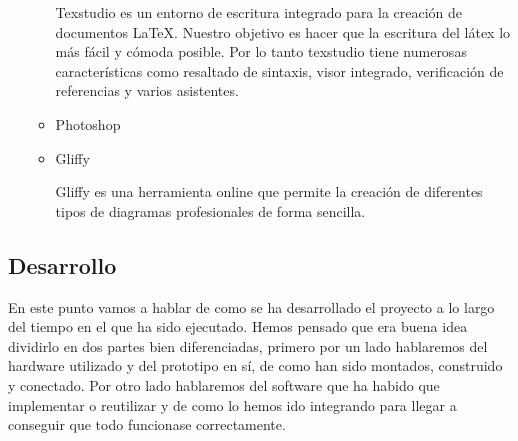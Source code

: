 \documentclass{pclass}
\begin{document}
\begin{itemize}
\begin{itemize}
		Texstudio es un entorno de escritura integrado para la creación de documentos LaTeX. Nuestro objetivo es hacer que la escritura del látex lo más fácil y cómoda posible. Por lo tanto texstudio tiene numerosas características como resaltado de sintaxis, visor integrado, verificación de referencias y varios asistentes.
			\cite{texstudio}
		\item Photoshop
		\item Gliffy
		
		Gliffy es una herramienta online que permite la creación de diferentes tipos de diagramas profesionales de forma sencilla.
			\cite{gliffy}
		
	\end{itemize}
\end{itemize}


\subsection{Desarrollo}

En este punto vamos a hablar de como se ha desarrollado el proyecto a lo largo del tiempo en el que ha sido ejecutado. Hemos pensado que era buena idea dividirlo en dos partes bien diferenciadas, primero por un lado hablaremos del hardware utilizado y del prototipo en sí, de como han sido montados, construido y conectado. Por otro lado hablaremos del software que ha habido que implementar o reutilizar y de como lo hemos ido integrando para llegar a conseguir que todo funcionase correctamente.
\end{document}
